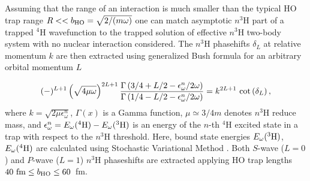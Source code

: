 \documentclass[5p,times]{elsarticle}
\begin{document}
Assuming that the range of an interaction is much smaller than the typical HO trap range $R << b_{\rm HO} =\sqrt{2/(m \omega)}$ one can match asymptotic $n ^3$H part of a trapped $^4$H wavefunction to the trapped solution of effective $n ^3$H two-body system with no nuclear interaction considered. The $n ^3$H phasehifts $\delta_L$ at relative momentum $k$ are then extracted using generalized Bush formula for an arbitrary orbital momentum $L$ \cite{Suzuki:2009}    

\begin{equation}
    (-)^{L+1} \left(\sqrt{4\mu \omega}\right)^{2L+1} \frac{\Gamma\left(3/4 + L/2 - \epsilon^n_\omega/2\omega\right)}{\Gamma\left(1/4 - L/2 - \epsilon^n_\omega/2\omega\right)} = k^{2L+1}~{\rm cot}\left(\delta_L \right),
\end{equation}
where $ k=\sqrt{2\mu \epsilon^n_\omega}$, $\Gamma(x)$ is a Gamma function, $\mu \simeq 3/4 m$ denotes $n ^3$H reduce mass, and $\epsilon^n_\omega = E_\omega (^4{\rm H})-E_\omega (^3{\rm H})$ is an energy of the $n$-th $^4$H excited state in a trap with respect to the $n ^3$H threshold. Here, bound state energies $E_\omega (^3{\rm H})$, $E_\omega (^4{\rm H})$ are calculated using Stochastic Variational Method \cite{Suzuki:1998bn}. Both $S$-wave ($L=0$) and $P$-wave ($L=1$) $n ^3$H phaseshifts are extracted applying HO trap lengths $40~{\rm fm} \leq b_{\rm HO} \leq 60$~fm.        

\end{document}
